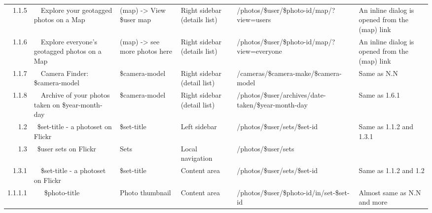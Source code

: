\documentclass[12pt,a4paper]{article}
\begin{document}
\begin{landscape}
\begin{table}[h!b!p!]
\begin{center}
\begin{tiny}
\begin{tabular}{r|l|l|l|l|p{3cm}}
                1.1.5 &
                ~~Explore your geotagged photos on a Map &
                (map) -> View \$user map &
                Right sidebar (details list) &
                /photos/\$user/\$photo-id/map/?view=users &
                An inline dialog is opened from the (map) link \\

                1.1.6 &
                ~~Explore everyone's geotagged photos on a Map &
                (map) -> see more photos here &
                Right sidebar (details list) &
                /photos/\$user/\$photo-id/map/?view=everyone &
                An inline dialog is opened from the (map) link \\

                1.1.7 &
                ~~Camera Finder: \$camera-model &
                \$camera-model &
                Right sidebar (detail list) &
                /cameras/\$camera-make/\$camera-model &
                Same as N.N \\

                1.1.8 &
                ~~Archive of your photos taken on \$year-month-day &
                \$camera-model &
                Right sidebar (detail list) &
                /photos/\$user/archives/date-taken/\$year-month-day &
                Same as 1.6.1 \\

              1.2 &
              ~\$set-title - a photoset on Flickr &
              \$set-title &
              Left sidebar &
              /photos/\$user/sets/\$set-id &
              Same as 1.1.2 and 1.3.1 \\

              1.3 &
              ~\$user sets on Flickr &
              Sets &
              Local navigation &
              /photos/\$user/sets &
              \\

                1.3.1 &
                ~~\$set-title - a photoset on Flickr &
                \$set-title &
                Content area &
                /photos/\$user/sets/\$set-id &
                Same as 1.1.2 and 1.2 \\

                  1.1.1.1 &
                  ~~~\$photo-title &
                  Photo thumbnail &
                  Content area &
                  /photos/\$user/\$photo-id/in/set-\$set-id &
                  Almost same as N.N and more\\



\end{tabular}
\end{tiny}
\end{center}
\end{table}
\end{landscape}
\end{document}
